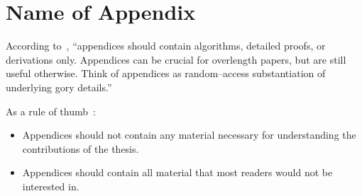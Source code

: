 \chapter{Name of Appendix}

According to~\cite{JW06}, \enquote{appendices should contain algorithms, detailed proofs,
or derivations only. Appendices can be crucial for overlength papers, but are still
useful otherwise. Think of appendices as random--access substantiation of underlying gory
details.}

As a rule of thumb~\cite{JW06}:
\begin{itemize}
    \item Appendices should not contain any material necessary for understanding the
        contributions of the thesis.
    \item Appendices should contain all material that most readers would not be interested
        in.
\end{itemize}
